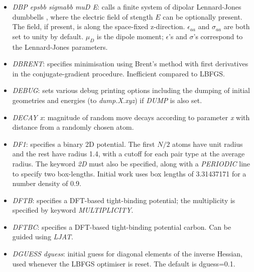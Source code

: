 \documentclass[12pt,a4paper,dvips]{article}
\begin{document}
\begin{itemize}
\item {\it DBP epsbb sigmabb muD E\/}: calls
a finite system of dipolar Lennard-Jones dumbbells \cite{ChakrabartiFW09}, where the electric field of stength $E$ can be
optionally present. The field, if present, is along the space-fixed z-direction. $\epsilon_{aa}$
and $\sigma_{aa}$ are both set to unity by default. $\mu_{D}$ is the dipole moment; $\epsilon$'s
and $\sigma$'s correspond to the Lennard-Jones parameters.

\item {\it DBRENT}: specifies minimisation using Brent's method with first derivatives in the
conjugate-gradient procedure. 
Inefficient compared to LBFGS.

\item {\it DEBUG\/}: sets various debug printing options including the dumping of initial
geometries and energies (to {\it dump.X.xyz\/}) if {\it DUMP} is also set.

\item {\it DECAY x\/}: magnitude of random move decays according to parameter
{\it x\/} with distance from a randomly chosen atom.

\item {\it DF1\/}: specifies a binary 2D potential.
The first $N/2$ atoms have unit radius and the rest
have radius 1.4, with a cutoff for each pair type at the
average radius.
The keyword {\it 2D\/} must also be specified, along with a
{\it PERIODIC\/} line to specify two box-lengths.
Initial work uses box lengths of 3.31437171 for a number density of 0.9.

\item {\it DFTB\/}: specifies a DFT-based tight-binding potential; the multiplicity is specified by
keyword {\it MULTIPLICITY\/}.

\item {\it DFTBC\/}: specifies a DFT-based tight-binding potential carbon.
Can be guided using {\it LJAT\/}.

\item {\it DGUESS dguess\/}: initial guess for diagonal elements of the inverse
      Hessian, used whenever the LBFGS optimiser is reset. 
      The default is dguess=0.1.


\end{itemize}
\end{document}
